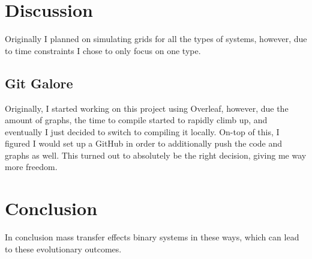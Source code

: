 \documentclass[12pt, letterpaper]{article}
\begin{document}

\section{\centering Discussion}   
    Originally I planned on simulating grids for all the types of systems, however, due to time constraints I chose to only focus on one type. 

    \subsection{Git Galore}
    Originally, I started working on this project using Overleaf, however, due the amount of graphs, the time to compile started to rapidly climb up, and eventually I just decided to switch to compiling it locally. On-top of this, I figured I would set up a GitHub in order to additionally push the code and graphs as well. This turned out to absolutely be the right decision, giving me way more freedom.
    

\section{\centering Conclusion}
    In conclusion mass transfer effects binary systems in these ways, which can lead to these evolutionary outcomes. 

\printbibliography[
heading=bibintoc,
title={\centering Sources}
]
\end{document}
